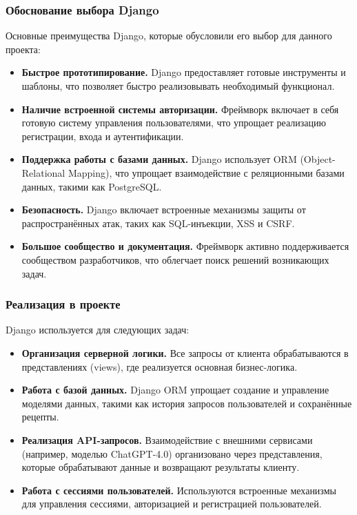 {{\subsubsection*{Обоснование выбора Django}
Основные преимущества Django, которые обусловили его выбор для данного проекта:
\begin{itemize}
    \item \textbf{Быстрое прототипирование.} Django предоставляет готовые инструменты и шаблоны, что позволяет быстро реализовывать необходимый функционал.
    \item \textbf{Наличие встроенной системы авторизации.} Фреймворк включает в себя готовую систему управления пользователями, что упрощает реализацию регистрации, входа и аутентификации.
    \item \textbf{Поддержка работы с базами данных.} Django использует ORM (Object-Relational Mapping), что упрощает взаимодействие с реляционными базами данных, такими как PostgreSQL.
    \item \textbf{Безопасность.} Django включает встроенные механизмы защиты от распространённых атак, таких как SQL-инъекции, XSS и CSRF.
    \item \textbf{Большое сообщество и документация.} Фреймворк активно поддерживается сообществом разработчиков, что облегчает поиск решений возникающих задач.
\end{itemize}

\subsubsection*{Реализация в проекте}
Django используется для следующих задач:
\begin{itemize}
    \item \textbf{Организация серверной логики.} Все запросы от клиента обрабатываются в представлениях (views), где реализуется основная бизнес-логика.
    \item \textbf{Работа с базой данных.} Django ORM упрощает создание и управление моделями данных, такими как история запросов пользователей и сохранённые рецепты.
    \item \textbf{Реализация API-запросов.} Взаимодействие с внешними сервисами (например, моделью ChatGPT-4.0) организовано через представления, которые обрабатывают данные и возвращают результаты клиенту.
    \item \textbf{Работа с сессиями пользователей.} Используются встроенные механизмы для управления сессиями, авторизацией и регистрацией пользователей.
\end{itemize}

}}
